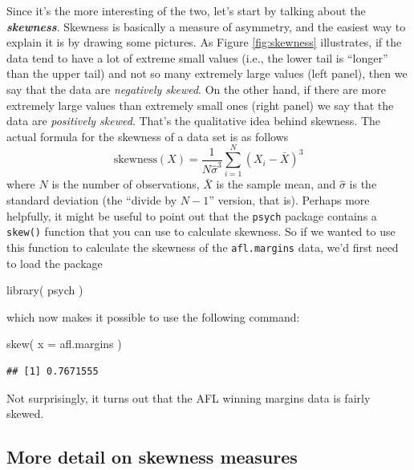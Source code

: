 \documentclass[
]{book}
\newenvironment{Shaded}{\begin{snugshade}}{\end{snugshade}}
\newcommand{\AttributeTok}[1]{\textcolor[rgb]{0.77,0.63,0.00}{#1}}
\newcommand{\FunctionTok}[1]{\textcolor[rgb]{0.00,0.00,0.00}{#1}}
\newcommand{\NormalTok}[1]{#1}
\begin{document}
Since it's the more interesting of the two, let's start by talking about the \textbf{\emph{skewness}}. Skewness is basically a measure of asymmetry, and the easiest way to explain it is by drawing some pictures. As Figure \ref{fig:skewness} illustrates, if the data tend to have a lot of extreme small values (i.e., the lower tail is ``longer'' than the upper tail) and not so many extremely large values (left panel), then we say that the data are \emph{negatively skewed}. On the other hand, if there are more extremely large values than extremely small ones (right panel) we say that the data are \emph{positively skewed}. That's the qualitative idea behind skewness. The actual formula for the skewness of a data set is as follows
\[
\mbox{skewness}(X) = \frac{1}{N \hat{\sigma}^3} \sum_{i=1}^N (X_i - \bar{X})^3
\]
where \(N\) is the number of observations, \(\bar{X}\) is the sample mean, and \(\hat{\sigma}\) is the standard deviation (the ``divide by \(N-1\)'' version, that is). Perhaps more helpfully, it might be useful to point out that the \texttt{psych} package contains a \texttt{skew()} function that you can use to calculate skewness. So if we wanted to use this function to calculate the skewness of the \texttt{afl.margins} data, we'd first need to load the package

\begin{Shaded}
\begin{Highlighting}[]
\FunctionTok{library}\NormalTok{( psych )}
\end{Highlighting}
\end{Shaded}

which now makes it possible to use the following command:

\begin{Shaded}
\begin{Highlighting}[]
\FunctionTok{skew}\NormalTok{( }\AttributeTok{x =}\NormalTok{ afl.margins )}
\end{Highlighting}
\end{Shaded}

\begin{verbatim}
## [1] 0.7671555
\end{verbatim}

Not surprisingly, it turns out that the AFL winning margins data is fairly skewed.

\hypertarget{more-detail-on-skewness-measures}{%
\subsection{More detail on skewness measures}\label{more-detail-on-skewness-measures}}
\end{document}

